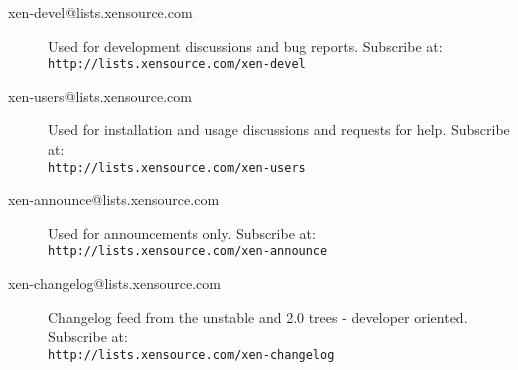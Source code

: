 \begin{description}
\item[xen-devel@lists.xensource.com] Used for development
  discussions and bug reports.  Subscribe at: \\
  {\small {\tt http://lists.xensource.com/xen-devel}}
\item[xen-users@lists.xensource.com] Used for installation and usage
  discussions and requests for help.  Subscribe at: \\
  {\small {\tt http://lists.xensource.com/xen-users}}
\item[xen-announce@lists.xensource.com] Used for announcements only.
  Subscribe at: \\
  {\small {\tt http://lists.xensource.com/xen-announce}}
\item[xen-changelog@lists.xensource.com] Changelog feed
  from the unstable and 2.0 trees - developer oriented.  Subscribe at: \\
  {\small {\tt http://lists.xensource.com/xen-changelog}}
\end{description}
